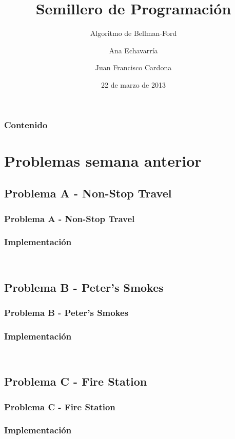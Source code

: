 \documentclass{beamer}
\title{Semillero de Programación}
\subtitle{Algoritmo de Bellman-Ford}
\author{Ana Echavarría \and Juan Francisco Cardona}
\institute{Universidad EAFIT}
\date{22 de marzo de 2013}
\begin{document}
\begin{frame}
	\titlepage
\end{frame}

\begin{frame}
	\frametitle{Contenido}
	\tableofcontents
\end{frame}

\section{Problemas semana anterior}
	\subsection{Problema A - Non-Stop Travel}
	\begin{frame}
		\frametitle{Problema A - Non-Stop Travel}
		
	\end{frame}
	
	\begin{frame}
		\frametitle{Implementación}
		\begin{lstlisting}
		
		\end{lstlisting}
	\end{frame}
	
	\subsection{Problema B - Peter's Smokes}
	\begin{frame}
		\frametitle{Problema B - Peter's Smokes}
		
	\end{frame}
	
	\begin{frame}
		\frametitle{Implementación}
		\begin{lstlisting}
		
		\end{lstlisting}
	\end{frame}
	
	\subsection{Problema C - Fire Station}
	\begin{frame}
		\frametitle{Problema C - Fire Station}
	\end{frame}
	
	\begin{frame}
		\frametitle{Implementación}
		\begin{lstlisting}
			
		\end{lstlisting}
	\end{frame}
\end{document}
